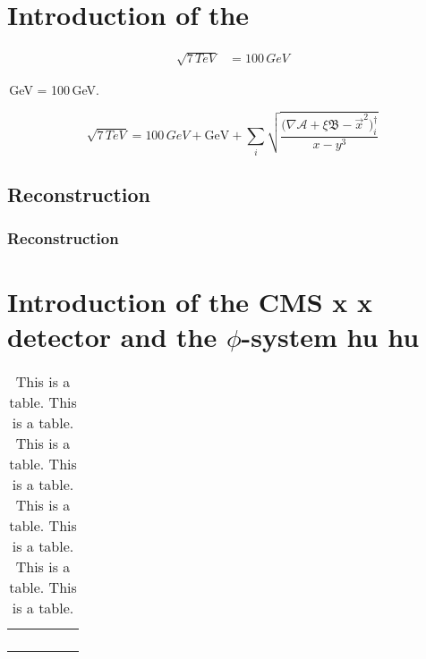 \chapter{Introduction of the}

\lipsum[1]

\begin{align}
\sqrt{7\,TeV} & =100\,{GeV}
\end{align}


\lipsum[4]

\lipsum[2]

\,GeV = 100\,GeV.

\begin{equation}
\sqrt{7\,TeV}=100\,{GeV}+\mathrm{GeV}+\sum_{i}\sqrt{\frac{\Big(\nabla\mathcal{A}+\xi\mathfrak{B}-\vec{x}^{2}\Big)_{i}^{\dagger}}{x-y^{3}}}
\end{equation}


\lipsum[4]


\section{Reconstruction}


\subsection{Reconstruction}

\lipsum[2]

\lipsum[1]


\chapter{Introduction of the CMS x x detector and the $\phi$-system hu hu}

\lipsum[4]

\lipsum[2]

\lipsum[2]

\lipsum[1]

\lipsum[2]

\begin{table}[th]
\caption{This is a table. This is a table. This is a table. This is a table.
This is a table. This is a table. This is a table. This is a table.}


\centering{}%
\begin{tabular}{|c|c|c|c|c|}
\hline 
 &  &  &  & \tabularnewline
\hline 
\hline 
 &  &  &  & \tabularnewline
\hline 
 &  &  &  & \tabularnewline
\hline 
 &  &  &  & \tabularnewline
\hline 
 &  &  &  & \tabularnewline
\hline 
\end{tabular}
\end{table}


